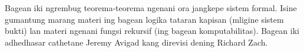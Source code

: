 \documentclass[../../include/open-logic-part]{subfiles}
\begin{document}

\begin{editorial}
 Bagean iki ngrembug teorema-teorema ngenani ora jangkepe
 sistem formal. Isine gumantung marang materi ing bagean
 logika tataran kapisan (mligine sistem bukti) lan materi
 ngenani fungsi rekursif (ing bagean komputabilitas).
 Bagean iki adhedhasar cathetane Jeremy Avigad kang
 direvisi dening Richard Zach.
\end{editorial}






\OLEndPartHook
\end{document}

